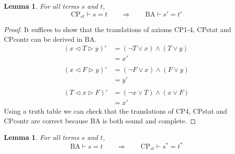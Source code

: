\documentclass[a4paper,twoside,openright]{report}
\newcommand{\lef}{\ensuremath{\triangleleft}}
\newcommand{\rig}{\ensuremath{\triangleright}}
\newtheorem{lem}[theorem]{Lemma}
\begin{document}
\begin{lem}\label{CPst in BA lem}
For all terms $s$ and $t$,
\[
\text{CP}_{st}\vdash s=t\qquad\Longrightarrow\qquad\text{BA}\vdash s'=t'
\]
\end{lem}
\begin{proof}
It suffices to show that the translations of axioms CP1-4, CPstat and CPcontr can be derived in BA.
\begin{align*}
(x\lef T\rig y)' &= (\neg T\vee x)\wedge(T\vee y)\\
&=x'\\\\
(x\lef F\rig y)' &= (\neg F\vee x)\wedge(F\vee y)\\
&=y'\\\\
(T\lef x\rig F)' &= (\neg x\vee T)\wedge(x\vee F)\\
&=x'
\end{align*}
Using a truth table we can check that the translations of CP4, CPstat and CPcontr are correct because BA is both sound and complete.
\end{proof}
\begin{lem}\label{BA in CPst lem}
For all terms $s$ and $t$,
\[
\text{BA}\vdash s=t\qquad\Longrightarrow\qquad\text{CP}_{st}\vdash s^*=t^*
\]
\end{lem}
\end{document}
